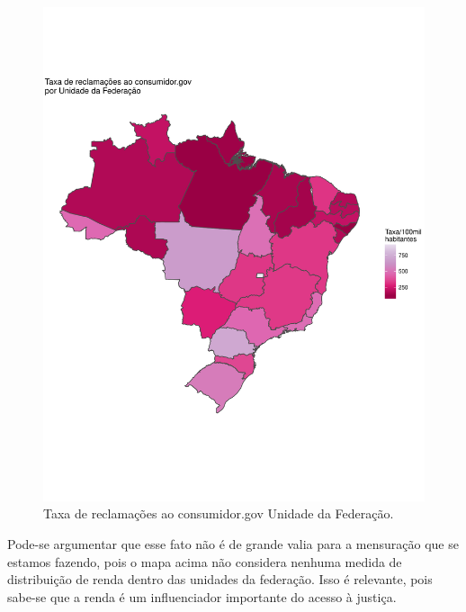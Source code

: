 \documentclass[]{report}
\begin{document}
\begin{figure}[htbp]
\centering
\includegraphics{imgs/mapa_senacon.pdf}
\caption{Taxa de reclamações ao consumidor.gov Unidade da
Federação.}\label{senacon_uf}
\end{figure}

Pode-se argumentar que esse fato não é de grande valia para a mensuração
que se estamos fazendo, pois o mapa acima não considera nenhuma medida
de distribuição de renda dentro das unidades da federação. Isso é
relevante, pois sabe-se que a renda é um influenciador importante do
acesso à justiça.
\end{document}
